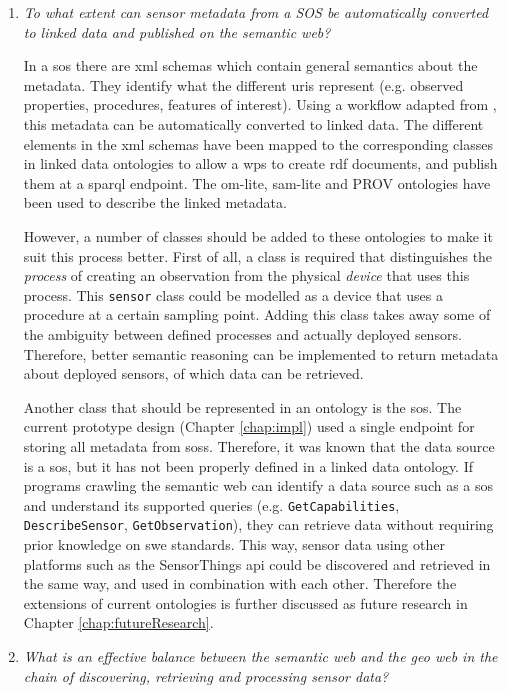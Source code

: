 \begin{enumerate}
\item \textit{To what extent can sensor metadata from a SOS be automatically converted to linked data and published on the semantic web?}%

In a \ac{sos} there are \ac{xml} schemas which contain general semantics about the metadata. They identify what the different \acp{uri} represent (e.g. observed properties, procedures, features of interest). Using a workflow adapted from \cite{LD:Missier}, this metadata can be automatically converted to linked data. The different elements in the \ac{xml} schemas have been mapped to the corresponding classes in linked data ontologies to allow a \ac{wps} to create \ac{rdf} documents, and publish them at a \ac{sparql} endpoint. The om-lite, sam-lite and PROV ontologies have been used to describe the linked metadata.

However, a number of classes should be added to these ontologies to make it suit this process better. First of all, a class is required that distinguishes the \textit{process} of creating an observation from the physical \textit{device} that uses this process. This \texttt{sensor} class could be modelled as a device that uses a procedure at a certain sampling point. Adding this class takes away some of the ambiguity between defined processes and actually deployed sensors. Therefore, better semantic reasoning can be implemented to return metadata about deployed sensors, of which data can be retrieved.  

Another class that should be represented in an ontology is the \acl{sos}. The current prototype design (Chapter \ref{chap:impl}) used a single endpoint for storing all metadata from \aclp{sos}. Therefore, it was known that the data source is a \ac{sos}, but it has not been properly defined in a linked data ontology. If programs crawling the semantic web can identify a data source such as a \ac{sos} and understand its supported queries (e.g. \texttt{GetCapabilities}, \texttt{DescribeSensor}, \texttt{GetObservation}), they can retrieve data without requiring prior knowledge on \ac{swe} standards. This way, sensor data using other platforms such as the SensorThings \ac{api} could be discovered and retrieved in the same way, and used in combination with each other. Therefore the extensions of current ontologies is further discussed as future research in Chapter \ref{chap:futureResearch}.  
           

\item \textit{What is an effective balance between the semantic web and the geo web in the chain of discovering, retrieving and processing sensor data?}%


\end{enumerate}
